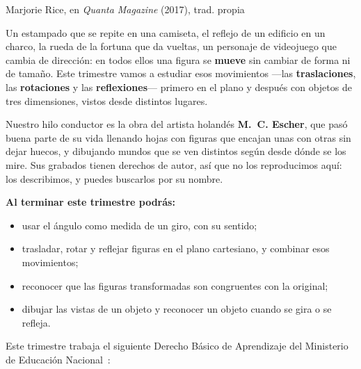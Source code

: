 \documentclass[11pt]{article}
\begin{document}
\encabezado

{Marjorie Rice, en \emph{Quanta Magazine} (2017), trad. propia}


Un estampado que se repite en una camiseta, el reflejo de un edificio en un charco, la rueda de
la fortuna que da vueltas, un personaje de videojuego que cambia de dirección: en todos ellos
una figura se \textbf{mueve} sin cambiar de forma ni de tamaño. Este trimestre vamos a estudiar
esos movimientos ---las \textbf{traslaciones}, las \textbf{rotaciones} y las
\textbf{reflexiones}--- primero en el plano y después con objetos de tres dimensiones, vistos
desde distintos lugares.

Nuestro hilo conductor es la obra del artista holandés \textbf{M.~C. Escher}, que pasó buena
parte de su vida llenando hojas con figuras que encajan unas con otras sin dejar huecos, y
dibujando mundos que se ven distintos según desde dónde se los mire. Sus grabados tienen derechos
de autor, así que no los reproducimos aquí: los describimos, y puedes buscarlos por su nombre.

\textbf{Al terminar este trimestre podrás:}
\begin{itemize}
  \item usar el ángulo como medida de un giro, con su sentido;
  \item trasladar, rotar y reflejar figuras en el plano cartesiano, y combinar esos movimientos;
  \item reconocer que las figuras transformadas son congruentes con la original;
  \item dibujar las vistas de un objeto y reconocer un objeto cuando se gira o se refleja.
\end{itemize}

Este trimestre trabaja el siguiente Derecho Básico de Aprendizaje del Ministerio de Educación
Nacional~\cite{mendba}:
\end{document}
